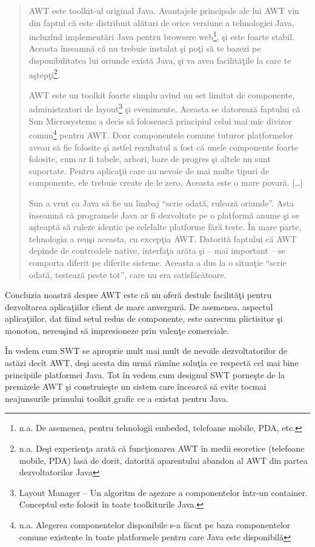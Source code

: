 \begin{quotation}
AWT este toolkit-ul original Java. Avantajele principale ale lui AWT vin din
faptul că este distribuit alături de orice versiune a tehnologiei Java,
incluzînd implementări Java pentru browsere web\footnote{n.a. De asemenea,
pentru tehnologii embeded, telefoane mobile, PDA, etc.}, şi este foarte stabil.
Aceasta înseamnă că nu trebuie instalat şi poţi să te bazezi pe disponibilitatea
lui oriunde există Java, şi va avea facilităţile la care te
aştepţi\footnote{n.a. Deşi experienţa arată că funcţionarea AWT în medii
esoretice (telefoane mobile, PDA) lasă de dorit, datorită aparentului abandon al
AWT din partea dezvoltatorilor Java}.

AWT este un toolkit foarte simplu avînd un set limitat de componente,
administratori de layout\footnote{Layout Manager -- Un algoritm de aşezare a
componentelor într-un container. Conceptul este folosit în toate toolkiturile
Java.} şi evenimente. Aceasta se datorează faptului că Sun Microsystems a decis
să folosească principiul celui mai mic divizor comun\footnote{n.a. Alegerea
componentelor disponibile s-a făcut pe baza componentelor comune existente în
toate platformele pentru care Java este disponibilă} pentru AWT. Doar
componentele comune tuturor platformelor aveau să fie folosite şi astfel
rezultatul a fost că unele componente foarte folosite, cum ar fi tabele, arbori,
bare de progres şi altele nu sunt suportate. Pentru aplicaţii care au nevoie de
mai multe tipuri de componente, ele trebuie create de le zero. Aceasta este o
mare povară. [\ldots]

Sun a vrut ca Java să fie un limbaj ``scrie odată, rulează oriunde''. Asta
înseamnă că programele Java ar fi dezvoltate pe o platformă anume şi se aşteaptă
să ruleze identic pe celelalte platforme fără teste. În mare parte, tehnologia a
reuşi aceasta, cu excepţia AWT. Datorită faptului că AWT depinde de controalele
native, interfaţa arăta şi -- mai important -- se comporta diferit pe diferite
sisteme. Aceasta a dus la o situaţie ``scrie odată, testează peste tot'', care
nu era satisfăcătoare.
\cite{swtawtswing}
\end{quotation}

Concluzia noastră despre AWT este că nu oferă destule facilităţi pentru
dezvoltarea aplicaţiilor client de mare anvergură. De asemenea, aspectul
aplicaţiilor, dat fiind setul redus de componente, este oarecum plictisitor şi
monoton, nereuşind să impresioneze prin valenţe comerciale.

În \cite{awtswing} vedem cum SWT se aproprie mult mai mult de nevoile
dezvoltatorilor de astăzi decît AWT, deşi acesta din urmă rămîne soluţia ce
respectă cel mai bine principiile platformei Java. Tot în \cite{awtswing} vedem
cum designul SWT porneşte de la premizele AWT şi construieşte un sistem care
încearcă să evite tocmai neajunsurile primului toolkit grafic ce a existat pentru
Java.

